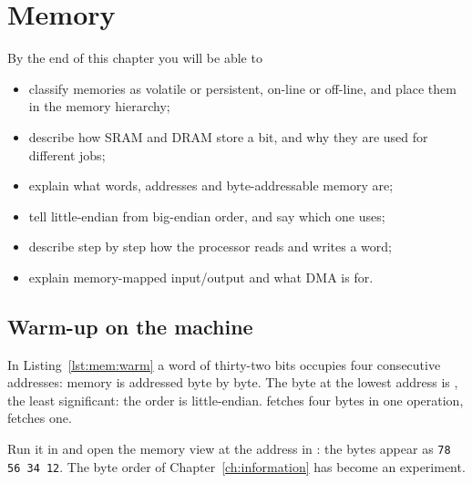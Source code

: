 \chapter{Memory}
\label{ch:memory}


\begin{chapgoals}
By the end of this chapter you will be able to
\begin{itemize}
\item classify memories as volatile or persistent, on-line or off-line, and place them in the memory hierarchy;
\item describe how SRAM and DRAM store a bit, and why they are used for different jobs;
\item explain what words, addresses and byte-addressable memory are;
\item tell little-endian from big-endian order, and say which one \riscv uses;
\item describe step by step how the processor reads and writes a word;
\item explain memory-mapped input/output and what DMA is for.
\end{itemize}
\end{chapgoals}


\section{Warm-up on the machine}


In Listing~\ref{lst:mem:warm} a word of thirty-two bits occupies four
consecutive addresses: memory is addressed byte by byte. The byte at the
lowest address is , the least significant: the order is little-endian.
 fetches four bytes in one operation,  fetches one.

\begin{prgtry}
Run it in \prgqt and open the memory view at the address in : the
bytes appear as \texttt{78 56 34 12}. The byte order of
Chapter~\ref{ch:information} has become an experiment.
\end{prgtry}

